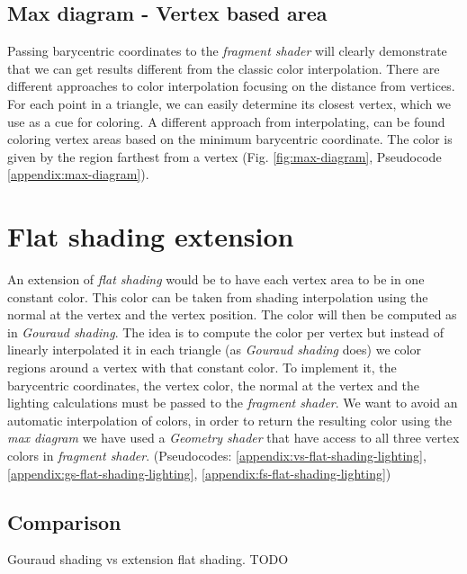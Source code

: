 
\subsection{Max diagram - Vertex based area} \label{section:max-diagram}
Passing barycentric coordinates to the \textit{fragment shader} will clearly demonstrate that we can get results different from the classic color interpolation.
There are different approaches to color interpolation focusing on the distance from vertices. For each point in a triangle, we can easily determine its closest vertex, which we use as a cue for coloring.
A different approach from interpolating, can be found coloring vertex areas based on the minimum barycentric coordinate.
The color is given by the region farthest from a vertex (Fig. \ref{fig:max-diagram}, Pseudocode \ref{appendix:max-diagram}).


\section{Flat shading extension} \label{section:extend-flat-shading-lighting}
An extension of \textit{flat shading} would be to have each vertex area to be in one constant color. This color can be taken from shading interpolation using the normal at the vertex and the vertex position.
The color will then be computed as in \textit{Gouraud shading}.
The idea is to compute the color per vertex but instead of linearly interpolated it in each triangle (as \textit{Gouraud shading} does) we color regions around a vertex with that constant color.
To implement it, the barycentric coordinates, the vertex color, the normal at the vertex and the lighting calculations must be passed to the \textit{fragment shader}.
We want to avoid an automatic interpolation of colors, in order to return the resulting color using the \textit{max diagram} we have used a \textit{Geometry shader} that have access to all three vertex colors in \textit{fragment shader}. (Pseudocodes: \ref{appendix:vs-flat-shading-lighting}, \ref{appendix:gs-flat-shading-lighting}, \ref{appendix:fs-flat-shading-lighting})

\subsection{Comparison}
Gouraud shading vs extension flat shading.
TODO

